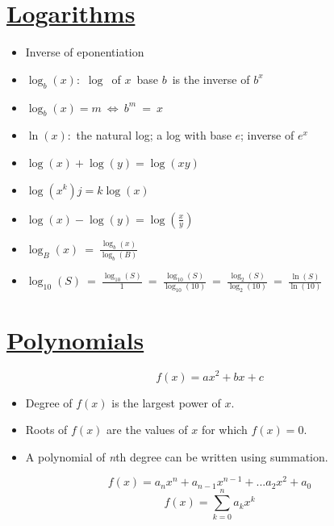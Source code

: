 \documentclass{article}
\begin{document}
\section{\underline{Logarithms}}
\begin{itemize}
  \item Inverse of eponentiation
  \item $\log_{b}(x)$:\ $\log$\ of $x$\ base $b$\ is the inverse of $b^{x}$
  \item $\log_{b}(x) = m\ \Leftrightarrow\ b^{m}\ =\ x$
  \item $\ln(x)$:\ the natural log; a log with base $e$; inverse of $e^{x}$
  \item $\log(x)+\log(y) = \log(xy)$
  \item $\log(x^{k})j = k \log(x)$
  \item $\log(x)-\log(y) = \log\left(\frac{x}{y}\right)$
  \item $\log_{B}(x)\ =\ \frac{\log_{b}(x)}{\log_{b}(B)}$
  \item $\log_{10}(S)\ =\ \frac{\log_{10}(S)}{1}\ =\ \frac{\log_{10}(S)}{\log_{10}(10)}\ =\ \frac{\log_{2}(S)}{\log_{2}(10)}\ =\ \frac{\ln(S)}{\ln(10)}$
\end{itemize}


\section{\underline{Polynomials}}

\begin{equation*}
  f(x) = ax^2 + bx + c
\end{equation*}
\begin{itemize}
\item Degree of $f(x)$ is the largest power of $x$.
\item Roots of $f(x)$ are the values of $x$ for which $f(x) = 0$.
\item A polynomial of \textit{n}th degree can be written using summation.
\end{itemize}

\begin{equation*}
  f(x) = a_{n}x^{n} + a_{n-1}x^{n-1} + ... a_{2}x^{2} + a_{0}
\end{equation*}
\begin{equation*}
  f(x) = \sum_{k=0}^{n} a_{k}x^{k}
\end{equation*}
\end{document}
